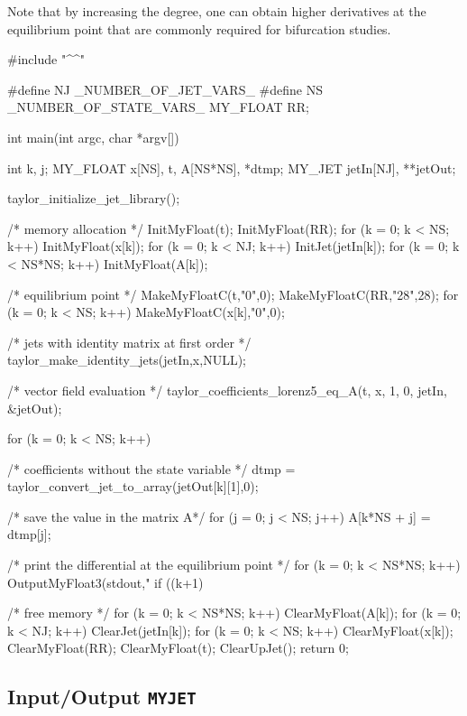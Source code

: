 \documentclass[10pt]{article}
\theoremstyle{remark}
\newcommand{\myjet}{{\tt MY\symbol{95}JET}}
\newcommand{\inputfiles}[1]{%
\ifthenelse{\equal{#1}{sec:ex0}}{{\tt lorenz1.eq}}{%
\ifthenelse{\equal{#1}{sec:ex1}}{{\tt lorenz1.eq}}{%
\ifthenelse{\equal{#1}{sec:ex_params}}{{\tt perturbation.eq}}{%
\ifthenelse{\equal{#1}{sec:ex_lyap}}{{\tt lorenz2.eq}}{%
\ifthenelse{\equal{#1}{sec:ex_varieq}}{{\tt lorenz3.eq}}{%
\ifthenelse{\equal{#1}{sec:ex5}}{{\tt lorenz4.eq}}{%
\ifthenelse{\equal{#1}{sec:ex_omp}}{{\tt lorenz4.eq}}{%
\ifthenelse{\equal{#1}{sec:ex_equilibria}}{{\tt lorenz5.eq}}{%
\ifthenelse{\equal{#1}{sec:ex_myjetaccess}}{{\tt model.eq}}{%
\ifthenelse{\equal{#1}{sec:ex_driving}}{{\tt lorenz1.eq}}{%
\ifthenelse{\equal{#1}{sec:ex_io_myjet}}{{\tt io\symbol{95}myjet.eq}}{%
ERROR!!!!!}}}}}}}}}}}%
}
\newcommand{\odecfiles}[1]{%
\ifthenelse{\equal{#1}{sec:ex0}}{{\tt lorenz1.c}}{%
\ifthenelse{\equal{#1}{sec:ex1}}{{\tt lorenz1.c}}{%
\ifthenelse{\equal{#1}{sec:ex_params}}{{\tt perturbation.c}}{%
\ifthenelse{\equal{#1}{sec:ex_lyap}}{{\tt lorenz2.c}}{%
\ifthenelse{\equal{#1}{sec:ex_varieq}}{{\tt lorenz3.c}}{%
\ifthenelse{\equal{#1}{sec:ex5}}{{\tt lorenz4.c}}{%
\ifthenelse{\equal{#1}{sec:ex_omp}}{{\tt lorenz4.c}}{%
\ifthenelse{\equal{#1}{sec:ex_equilibria}}{{\tt lorenz5.c}}{%
\ifthenelse{\equal{#1}{sec:ex_myjetaccess}}{{\tt jdata.c}}{%
\ifthenelse{\equal{#1}{sec:ex_driving}}{{\tt lorenz.c}}{%
\ifthenelse{\equal{#1}{sec:ex_io_myjet}}{{\tt io\symbol{95}myjet.c}}{%
ERROR!!!!!}}}}}}}}}}}%
}
\newcommand{\odehfiles}[1]{%
\ifthenelse{\equal{#1}{sec:ex0}}{{\tt taylor.h}}{%
\ifthenelse{\equal{#1}{sec:ex1}}{{\tt taylor.h}}{%
\ifthenelse{\equal{#1}{sec:ex_params}}{{\tt taylor.h}}{%
\ifthenelse{\equal{#1}{sec:ex_lyap}}{{\tt lorenz2.h}}{%
\ifthenelse{\equal{#1}{sec:ex_varieq}}{{\tt lorenz3.h}}{%
\ifthenelse{\equal{#1}{sec:ex5}}{{\tt lorenz4.h}}{%
\ifthenelse{\equal{#1}{sec:ex_omp}}{{\tt lorenz4.h}}{%
\ifthenelse{\equal{#1}{sec:ex_equilibria}}{{\tt lorenz5.h}}{%
\ifthenelse{\equal{#1}{sec:ex_myjetaccess}}{{\tt jdata.h}}{%
\ifthenelse{\equal{#1}{sec:ex_driving}}{{\tt taylor.h}}{%
\ifthenelse{\equal{#1}{sec:ex_io_myjet}}{{\tt io\symbol{95}myjet.h}}{%
ERROR!!!!!}}}}}}}}}}}%
}
\newcommand{\mainfiles}[1]{%
\ifthenelse{\equal{#1}{sec:ex0}}{{\tt main\symbol{95}lrnz.c}}{%
\ifthenelse{\equal{#1}{sec:ex1}}{{\tt main\symbol{95}lrnz.c}}{%
\ifthenelse{\equal{#1}{sec:ex_params}}{{\tt main\symbol{95}params.c}}{%
\ifthenelse{\equal{#1}{sec:ex_lyap}}{{\tt main\symbol{95}lyap.c}}{%
\ifthenelse{\equal{#1}{sec:ex_varieq}}{{\tt main\symbol{95}varieq.c}}{%
\ifthenelse{\equal{#1}{sec:ex5}}{{\tt main4.c}}{%
\ifthenelse{\equal{#1}{sec:ex_omp}}{{\tt main\symbol{95}omp.c}}{%
\ifthenelse{\equal{#1}{sec:ex_equilibria}}{{\tt main\symbol{95}equilibria.c}}{%
\ifthenelse{\equal{#1}{sec:ex_myjetaccess}}{{\tt jdata\symbol{95}main.c}}{%
\ifthenelse{\equal{#1}{sec:ex_io_myjet}}{{\tt io\symbol{95}main.c}}{%
ERROR!!!!!}}}}}}}}}}%
}
\newcommand{\inputfile}{}
\newcommand{\mainfile}{}
\newcommand{\odecfile}{}
\newcommand{\odehfile}{}
\begin{document}
Note that by increasing the degree, one can obtain higher derivatives
at the equilibrium point that are commonly required for bifurcation
studies.
\begin{code}[title={File: \mainfile{}}]
    #include "^\odehfile{}^"

    #define NJ _NUMBER_OF_JET_VARS_
    #define NS _NUMBER_OF_STATE_VARS_
    MY_FLOAT RR;
    
    int main(int argc, char *argv[])
    {
      int k, j;
      MY_FLOAT x[NS], t, A[NS*NS], *dtmp;
      MY_JET jetIn[NJ], **jetOut;
      
      taylor_initialize_jet_library();
      
      /* memory allocation */
      InitMyFloat(t);
      InitMyFloat(RR);
      for (k = 0; k < NS; k++) {InitMyFloat(x[k]);}
      for (k = 0; k < NJ; k++) {InitJet(jetIn[k]);}
      for (k = 0; k < NS*NS; k++) {InitMyFloat(A[k]);}
      
      /* equilibrium point */
      MakeMyFloatC(t,"0",0);
      MakeMyFloatC(RR,"28",28);
      for (k = 0; k < NS; k++) {MakeMyFloatC(x[k],"0",0);}
      
      /* jets with identity matrix at first order */
      taylor_make_identity_jets(jetIn,x,NULL);
      
      /* vector field evaluation */
      taylor_coefficients_lorenz5_eq_A(t, x, 1, 0, jetIn, &jetOut);
      
      for (k = 0; k < NS; k++) 
      {
        /* coefficients without the state variable */
        dtmp = taylor_convert_jet_to_array(jetOut[k][1],0);
        
        /* save the value in the matrix A*/
        for (j = 0; j < NS; j++) A[k*NS + j] = dtmp[j];   
      }
      
      /* print the differential at the equilibrium point */
      for (k = 0; k < NS*NS; k++) 
      {
        OutputMyFloat3(stdout,"%
        if ((k+1) %
      }
      
      /* free memory */
      for (k = 0; k < NS*NS; k++) {ClearMyFloat(A[k]);}
      for (k = 0; k < NJ; k++) {ClearJet(jetIn[k]);}
      for (k = 0; k < NS; k++) {ClearMyFloat(x[k]);}
      ClearMyFloat(RR); ClearMyFloat(t);
      ClearUpJet();
      return 0;
    }
\end{code}

\subsection{Input/Output \myjet{}} 
\renewcommand{\inputfile}{\inputfiles{sec:ex_io_myjet}}
\renewcommand{\odecfile}{\odecfiles{sec:ex_io_myjet}}
\renewcommand{\odehfile}{\odehfiles{sec:ex_io_myjet}}
\renewcommand{\mainfile}{\mainfiles{sec:ex_io_myjet}}
\end{document}
